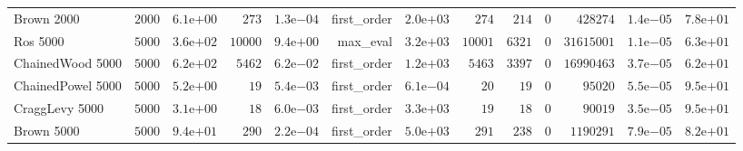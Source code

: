 \begin{longtable}[c]{lrrrrrrrrrrrr}
Brown 2000 & \( 2000\) & \( 6.1\)e\(+00\) & \(  273\) & \( 1.3\)e\(-04\) & first\_order & \( 2.0\)e\(+03\) & \(  274\) & \(  214\) & \(    0\) & \(428274\) & \( 1.4\)e\(-05\) & \( 7.8\)e\(+01\) \\
Ros 5000 & \( 5000\) & \( 3.6\)e\(+02\) & \(10000\) & \( 9.4\)e\(+00\) & max\_eval & \( 3.2\)e\(+03\) & \(10001\) & \( 6321\) & \(    0\) & \(31615001\) & \( 1.1\)e\(-05\) & \( 6.3\)e\(+01\) \\
ChainedWood 5000 & \( 5000\) & \( 6.2\)e\(+02\) & \( 5462\) & \( 6.2\)e\(-02\) & first\_order & \( 1.2\)e\(+03\) & \( 5463\) & \( 3397\) & \(    0\) & \(16990463\) & \( 3.7\)e\(-05\) & \( 6.2\)e\(+01\) \\
ChainedPowel 5000 & \( 5000\) & \( 5.2\)e\(+00\) & \(   19\) & \( 5.4\)e\(-03\) & first\_order & \( 6.1\)e\(-04\) & \(   20\) & \(   19\) & \(    0\) & \(95020\) & \( 5.5\)e\(-05\) & \( 9.5\)e\(+01\) \\
CraggLevy 5000 & \( 5000\) & \( 3.1\)e\(+00\) & \(   18\) & \( 6.0\)e\(-03\) & first\_order & \( 3.3\)e\(+03\) & \(   19\) & \(   18\) & \(    0\) & \(90019\) & \( 3.5\)e\(-05\) & \( 9.5\)e\(+01\) \\
Brown 5000 & \( 5000\) & \( 9.4\)e\(+01\) & \(  290\) & \( 2.2\)e\(-04\) & first\_order & \( 5.0\)e\(+03\) & \(  291\) & \(  238\) & \(    0\) & \(1190291\) & \( 7.9\)e\(-05\) & \( 8.2\)e\(+01\) \\
\hline 
\end{longtable}



